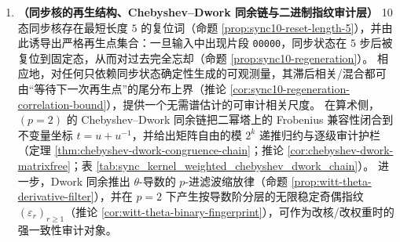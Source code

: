 \begin{enumerate}
  \item \textbf{（同步核的再生结构、Chebyshev--Dwork 同余链与二进制指纹审计层）}
  10 态同步核存在最短长度 \(5\) 的复位词（命题 \ref{prop:sync10-reset-length-5}），并由此诱导出严格再生点集合：一旦输入中出现片段 \texttt{00000}，同步状态在 \(5\) 步后被复位到固定态，从而对过去完全忘却（命题 \ref{prop:sync10-regeneration}）。
  相应地，对任何只依赖同步状态确定性生成的可观测量，其滞后相关/混合都可由“等待下一次再生点”的尾分布上界（推论 \ref{cor:sync10-regeneration-correlation-bound}），提供一个无需谱估计的可审计相关尺度。
  在算术侧，\((p=2)\) 的 Chebyshev--Dwork 同余链把二幂塔上的 Frobenius 兼容性闭合到不变量坐标 \(t=u+u^{-1}\)，并给出矩阵自由的模 \(2^k\) 递推归约与逐级审计护栏（定理 \ref{thm:chebyshev-dwork-congruence-chain}；推论 \ref{cor:chebyshev-dwork-matrixfree}；表 \ref{tab:sync_kernel_weighted_chebyshev_dwork_chain}）。
  进一步，Dwork 同余推出 \(\theta\)-导数的 \(p\)-进滤波缩放律（命题 \ref{prop:witt-theta-derivative-filter}），并在 \(p=2\) 下产生按导数阶分层的无限稳定奇偶指纹 \((\varepsilon_r)_{r\ge 1}\)（推论 \ref{cor:witt-theta-binary-fingerprint}），可作为改核/改权重时的强一致性审计对象。

\end{enumerate}
